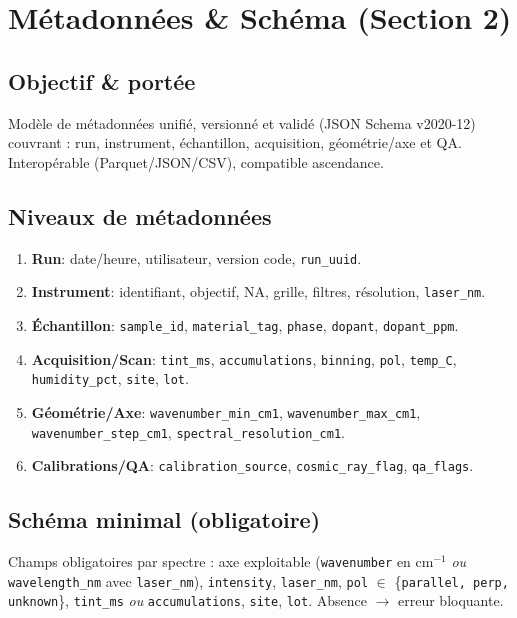 
\section{Métadonnées \& Schéma (Section 2)}

\subsection{Objectif \& portée}
Modèle de métadonnées unifié, versionné et validé (JSON Schema v2020-12) couvrant : run, instrument, échantillon, acquisition, géométrie/axe et QA. Interopérable (Parquet/JSON/CSV), compatible ascendance.

\subsection{Niveaux de métadonnées}
\begin{enumerate}[nosep]
\item \textbf{Run}: date/heure, utilisateur, version code, \texttt{run\_uuid}.
\item \textbf{Instrument}: identifiant, objectif, NA, grille, filtres, résolution, \texttt{laser\_nm}.
\item \textbf{Échantillon}: \texttt{sample\_id}, \texttt{material\_tag}, \texttt{phase}, \texttt{dopant}, \texttt{dopant\_ppm}.
\item \textbf{Acquisition/Scan}: \texttt{tint\_ms}, \texttt{accumulations}, \texttt{binning}, \texttt{pol}, \texttt{temp\_C}, \texttt{humidity\_pct}, \texttt{site}, \texttt{lot}.
\item \textbf{Géométrie/Axe}: \texttt{wavenumber\_min\_cm1}, \texttt{wavenumber\_max\_cm1}, \texttt{wavenumber\_step\_cm1}, \texttt{spectral\_resolution\_cm1}.
\item \textbf{Calibrations/QA}: \texttt{calibration\_source}, \texttt{cosmic\_ray\_flag}, \texttt{qa\_flags}.
\end{enumerate}

\subsection{Schéma minimal (obligatoire)}
Champs obligatoires par spectre : axe exploitable (\texttt{wavenumber} en cm$^{-1}$ \emph{ou} \texttt{wavelength\_nm} avec \texttt{laser\_nm}), \texttt{intensity}, \texttt{laser\_nm}, \texttt{pol} $\in$ \{\texttt{parallel, perp, unknown}\}, \texttt{tint\_ms} \emph{ou} \texttt{accumulations}, \texttt{site}, \texttt{lot}. Absence $\rightarrow$ erreur bloquante.

